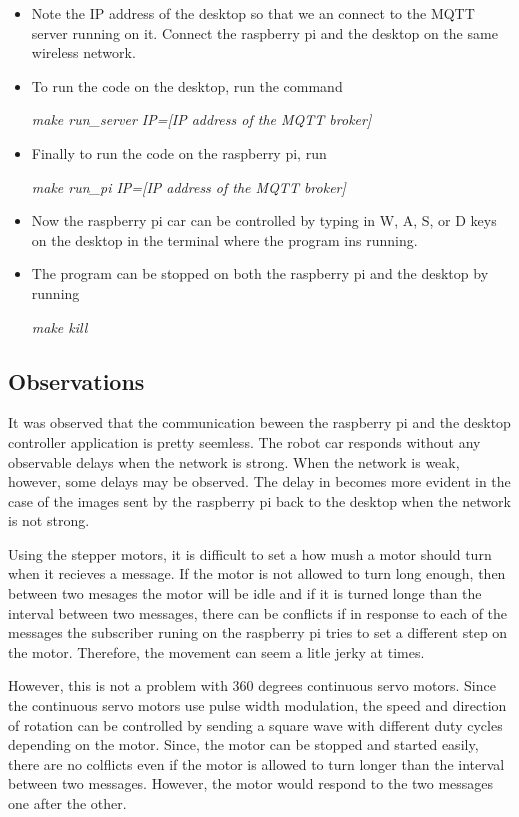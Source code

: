 \documentclass[sigconf]{acmart}
\begin{document}
\begin{itemize}
{\em make setup\_server}

\item Note the IP address of the desktop so that we an connect to the MQTT server running on it. Connect the raspberry pi and the desktop on the same wireless network.

\item To run the code on the desktop, run the command

{\em make run\_server IP=[IP address of the MQTT broker]}

\item Finally to run the code on the raspberry pi, run 

{\em make run\_pi IP=[IP address of the MQTT broker]}

\item Now the raspberry pi car can be controlled by typing in  W, A, S, or D keys on the desktop in the terminal where the program ins running.

\item The program can be stopped on both the raspberry pi and the desktop by running 

{\em make kill}

\end{itemize}

\subsection{Observations}
It was observed that the communication beween the raspberry pi and the desktop controller application is pretty seemless. The robot car responds without any observable delays when the network is strong. When the network is weak, however, some delays may be observed. The delay in becomes more evident in the case of the images sent by the raspberry pi back to the desktop when the network is not strong.

Using the stepper motors, it is difficult to set a how mush a motor should turn when it recieves a message. If the motor is not allowed to turn long enough, then between two mesages the motor will be idle and if it is turned longe than the interval between two messages, there can be conflicts if in response to each of the messages the subscriber runing on the raspberry pi tries to set a different step on the motor. Therefore, the movement can seem a litle jerky at times.

However, this is not a problem with 360 degrees continuous servo motors. Since the continuous servo motors use pulse width modulation, the speed and direction of rotation can be controlled by sending a square wave with different duty cycles depending on the motor. Since, the motor can be stopped and started easily, there are no colflicts even if the motor is allowed to turn longer than the interval between two messages. However, the motor would respond to the two messages one after the other.
\end{document}
